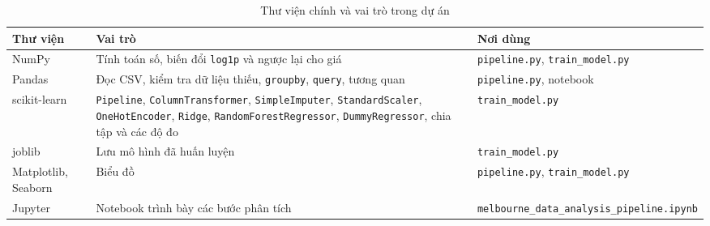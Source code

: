 \begin{table}[H]
\centering
\caption{Thư viện chính và vai trò trong dự án}\label{tab:thuvien}
\small
\begin{tabular}{@{}l L{6.2cm} L{4.6cm}@{}}
\toprule
Thư viện & Vai trò & Nơi dùng \\
\midrule
NumPy & Tính toán số, biến đổi \texttt{log1p} và ngược lại cho giá & \texttt{pipeline.py}, \texttt{train\_model.py} \\
Pandas & Đọc CSV, kiểm tra dữ liệu thiếu, \texttt{groupby}, \texttt{query}, tương quan & \texttt{pipeline.py}, notebook \\
scikit-learn & \texttt{Pipeline}, \texttt{ColumnTransformer}, \texttt{SimpleImputer}, \texttt{StandardScaler}, \texttt{OneHotEncoder}, \texttt{Ridge}, \texttt{RandomForestRegressor}, \texttt{DummyRegressor}, chia tập và các độ đo & \texttt{train\_model.py} \\
joblib & Lưu mô hình đã huấn luyện & \texttt{train\_model.py} \\
Matplotlib, Seaborn & Biểu đồ & \texttt{pipeline.py}, \texttt{train\_model.py} \\
Jupyter & Notebook trình bày các bước phân tích & \texttt{melbourne\_\allowbreak data\_\allowbreak analysis\_\allowbreak pipeline.ipynb} \\
\bottomrule
\end{tabular}
\end{table}
